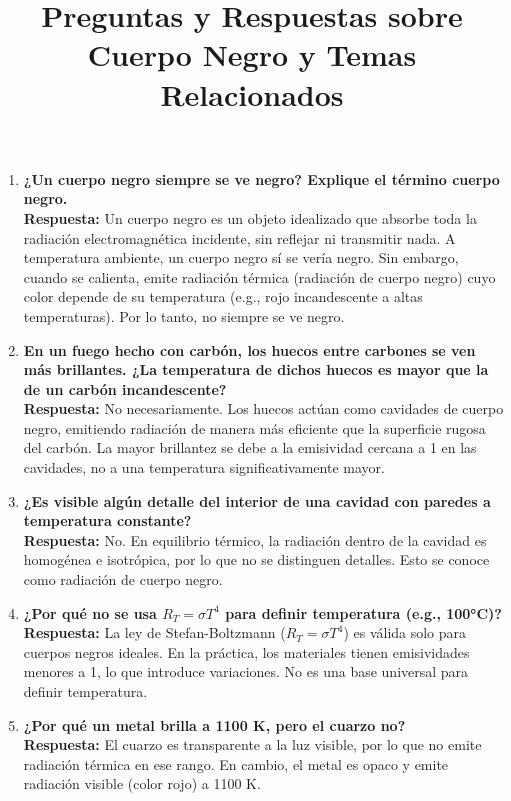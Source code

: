 \documentclass{article}
\title{Preguntas y Respuestas sobre Cuerpo Negro y Temas Relacionados}
\author{}
\date{}
\begin{document}
\maketitle

\begin{enumerate}[leftmargin=*]

\item \textbf{¿Un cuerpo negro siempre se ve negro? Explique el término cuerpo negro.} \\
\textbf{Respuesta:} Un cuerpo negro es un objeto idealizado que absorbe toda la radiación electromagnética incidente, sin reflejar ni transmitir nada. A temperatura ambiente, un cuerpo negro sí se vería negro. Sin embargo, cuando se calienta, emite radiación térmica (radiación de cuerpo negro) cuyo color depende de su temperatura (e.g., rojo incandescente a altas temperaturas). Por lo tanto, no siempre se ve negro.

\item \textbf{En un fuego hecho con carbón, los huecos entre carbones se ven más brillantes. ¿La temperatura de dichos huecos es mayor que la de un carbón incandescente?} \\
\textbf{Respuesta:} No necesariamente. Los huecos actúan como cavidades de cuerpo negro, emitiendo radiación de manera más eficiente que la superficie rugosa del carbón. La mayor brillantez se debe a la emisividad cercana a 1 en las cavidades, no a una temperatura significativamente mayor.

\item \textbf{¿Es visible algún detalle del interior de una cavidad con paredes a temperatura constante?} \\
\textbf{Respuesta:} No. En equilibrio térmico, la radiación dentro de la cavidad es homogénea e isotrópica, por lo que no se distinguen detalles. Esto se conoce como radiación de cuerpo negro.

\item \textbf{¿Por qué no se usa \( R_T = \sigma T^4 \) para definir temperatura (e.g., 100°C)?} \\
\textbf{Respuesta:} La ley de Stefan-Boltzmann (\( R_T = \sigma T^4 \)) es válida solo para cuerpos negros ideales. En la práctica, los materiales tienen emisividades menores a 1, lo que introduce variaciones. No es una base universal para definir temperatura.

\item \textbf{¿Por qué un metal brilla a 1100 K, pero el cuarzo no?} \\
\textbf{Respuesta:} El cuarzo es transparente a la luz visible, por lo que no emite radiación térmica en ese rango. En cambio, el metal es opaco y emite radiación visible (color rojo) a 1100 K.


\end{enumerate}
\end{document}
